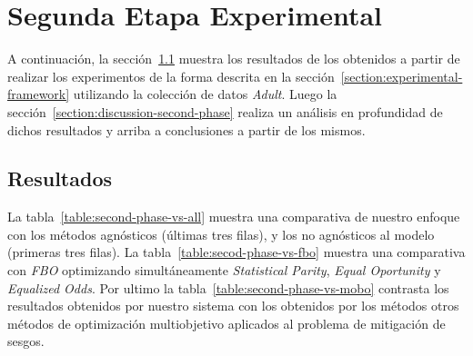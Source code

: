 \section{Segunda Etapa Experimental}\label{section:experiments-second-phase}

A continuación, la sección~\ref{section:results-second-phase} muestra los resultados de los obtenidos a partir de realizar los experimentos de la forma descrita en la sección~\ref{section:experimental-framework} utilizando la colección de datos \emph{Adult}.
Luego la sección~\ref{section:discussion-second-phase} realiza un análisis en profundidad de dichos resultados y arriba a conclusiones a partir de los mismos.

\subsection{Resultados}\label{section:results-second-phase}

La tabla~\ref{table:second-phase-vs-all} muestra una comparativa de nuestro enfoque con los métodos agnósticos (últimas tres filas), y los no agnósticos al modelo (primeras tres filas).
La tabla~\ref{table:secod-phase-vs-fbo} muestra una comparativa con \emph{FBO} optimizando simultáneamente \emph{Statistical Parity}, \emph{Equal Oportunity} y \emph{Equalized Odds}.
Por ultimo la tabla~\ref{table:second-phase-vs-mobo} contrasta los resultados obtenidos por nuestro sistema con los obtenidos por los métodos otros métodos de optimización multiobjetivo aplicados al problema de mitigación de sesgos.

